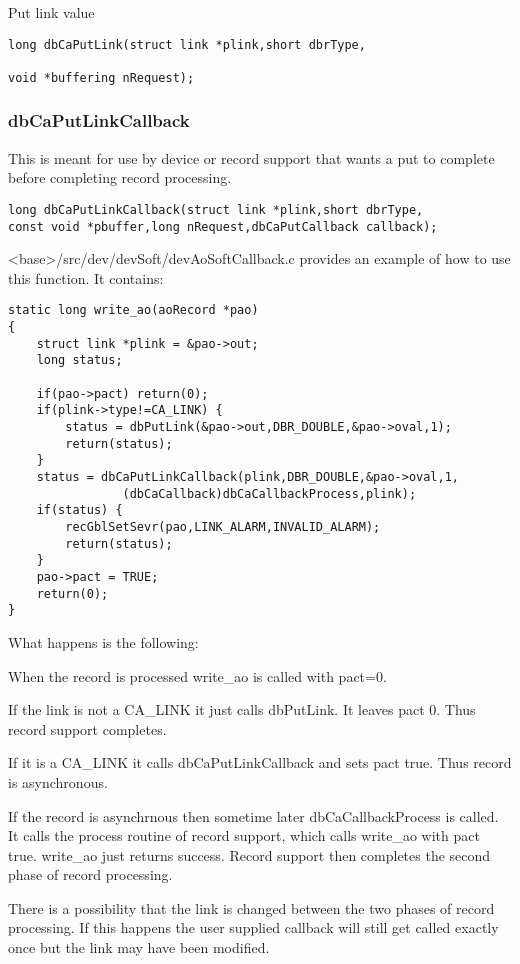 Put link value

\begin{verbatim}long dbCaPutLink(struct link *plink,short dbrType,

void *buffering nRequest);
\end{verbatim}\subsubsection{dbCaPutLinkCallback}

This is meant for use by device or record support that wants a put to complete before completing record processing.

\begin{verbatim}long dbCaPutLinkCallback(struct link *plink,short dbrType,
const void *pbuffer,long nRequest,dbCaPutCallback callback);
\end{verbatim}\textless{}base\textgreater{}/src/dev/devSoft/devAoSoftCallback.c provides an example of how to use this function. It contains:

\begin{verbatim}
static long write_ao(aoRecord *pao)
{
    struct link *plink = &pao->out;
    long status;

    if(pao->pact) return(0);
    if(plink->type!=CA_LINK) {
        status = dbPutLink(&pao->out,DBR_DOUBLE,&pao->oval,1);
        return(status);
    }
    status = dbCaPutLinkCallback(plink,DBR_DOUBLE,&pao->oval,1,
                (dbCaCallback)dbCaCallbackProcess,plink);
    if(status) {
        recGblSetSevr(pao,LINK_ALARM,INVALID_ALARM);
        return(status);
    }
    pao->pact = TRUE;
    return(0);
}
\end{verbatim}What happens is the following:

\begin{description}\item When the record is processed write\_ao is called with pact=0.

\end{description}If the link is not a CA\_LINK it just calls dbPutLink. It leaves pact 0. Thus record support completes.

If it is a CA\_LINK it calls dbCaPutLinkCallback and sets pact true. Thus record is asynchronous.

\begin{description}\item If the record is asynchrnous then sometime later  dbCaCallbackProcess is called. It calls the process routine of 
record support, which calls write\_ao with pact true. write\_ao just returns success. Record support then completes 
the second phase of record processing.

\end{description}There is a possibility that the link is changed between the two phases of record processing. If this happens the user 
supplied callback will still get called exactly once but the link may have been modified.

